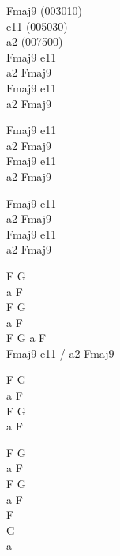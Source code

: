 \begin{chord}
Fmaj9 (003010)\\
e11 (005030)\\
a2 (007500)\\
Fmaj9 e11\\
a2 Fmaj9\\
Fmaj9 e11\\
a2 Fmaj9

Fmaj9 e11\\
a2 Fmaj9\\
Fmaj9 e11\\
a2 Fmaj9

Fmaj9 e11\\
a2 Fmaj9\\
Fmaj9 e11\\
a2 Fmaj9

F G\\
a F\\
F G\\
a F\\
F G a F\\
Fmaj9 e11 / a2 Fmaj9

F G\\
a F\\
F G\\
a F

F G\\
a F\\
F G\\
a F\\
F\\
G\\
a
\end{chord}
